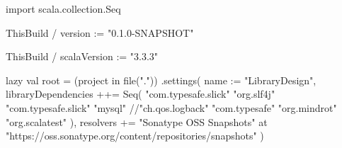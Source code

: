 import scala.collection.Seq

ThisBuild / version := "0.1.0-SNAPSHOT"

ThisBuild / scalaVersion := "3.3.3"

lazy val root = (project in file("."))
  .settings(
    name := "LibraryDesign",
    libraryDependencies ++= Seq(
      "com.typesafe.slick" %
      "org.slf4j" %
      "com.typesafe.slick" %
      "mysql" %
      //"ch.qos.logback" %
      "com.typesafe" %
      "org.mindrot" %
      "org.scalatest" %
    ),
    resolvers += "Sonatype OSS Snapshots" at "https://oss.sonatype.org/content/repositories/snapshots"
  )
